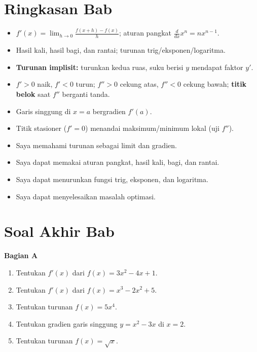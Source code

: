 \documentclass[11pt,a4paper]{report}
\theoremstyle{gaya}
\newcommand{\bagiansoal}[2]{%
  \par\medskip\noindent
  {\large\bfseries\color{biru}Bagian #1}\par\smallskip
  \addcontentsline{toc}{subsection}{Bagian #1}}
\newcommand{\cek}{\ding{113}\ } %
\begin{document}
\section*{Ringkasan Bab}
\begin{itemize}[leftmargin=*,topsep=2pt]
  \item $f'(x)=\lim_{h\to0}\tfrac{f(x+h)-f(x)}{h}$; aturan pangkat $\tfrac{d}{dx}x^n=nx^{n-1}$.
  \item Hasil kali, hasil bagi, dan rantai; turunan trig/eksponen/logaritma.
  \item \textbf{Turunan implisit:} turunkan kedua ruas, suku berisi $y$ mendapat faktor $y'$.
  \item $f'>0$ naik, $f'<0$ turun; $f''>0$ cekung atas, $f''<0$ cekung bawah; \textbf{titik belok} saat $f''$ berganti tanda.
  \item Garis singgung di $x=a$ bergradien $f'(a)$.
  \item Titik stasioner ($f'=0$) menandai maksimum/minimum lokal (uji $f''$).
\end{itemize}

\begin{refleksi}
\begin{itemize}[leftmargin=*,topsep=2pt]
  \item[\cek] Saya memahami turunan sebagai limit dan gradien.
  \item[\cek] Saya dapat memakai aturan pangkat, hasil kali, bagi, dan rantai.
  \item[\cek] Saya dapat menurunkan fungsi trig, eksponen, dan logaritma.
  \item[\cek] Saya dapat menyelesaikan masalah optimasi.
\end{itemize}
\end{refleksi}

\section*{Soal Akhir Bab \thechapter}

\bagiansoal{A}{(Fundamental --- setara SNBT Dasar)}
\begin{enumerate}[leftmargin=*]
  \item Tentukan $f'(x)$ dari $f(x)=3x^2-4x+1$.
  \item Tentukan $f'(x)$ dari $f(x)=x^3-2x^2+5$.
  \item Tentukan turunan $f(x)=5x^4$.
  \item Tentukan gradien garis singgung $y=x^2-3x$ di $x=2$.
  \item Tentukan turunan $f(x)=\sqrt{x}$.
\end{enumerate}
\end{document}
